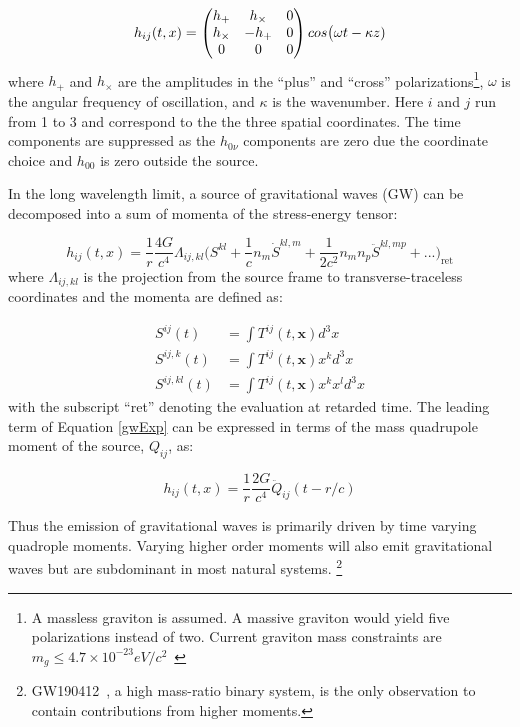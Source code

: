 \documentclass [12pt, proquest]{uwthesis}[2019]
\begin{document}
\begin{equation}
h_{ij}(t,x)=\begin{pmatrix} h_+ & h_\times & 0 \\ h_\times & -h_+ & 0 \\ 0 & 0 & 0\end{pmatrix} \\cos\big(\omega t - \kappa z)
\end{equation}
where $h_+$ and $h_\times$ are the amplitudes in the ``plus'' and ``cross'' polarizations\footnote{A massless graviton is assumed. A massive graviton would yield five polarizations instead of two. Current graviton mass constraints are $m_g\leq 4.7\times 10^{-23} eV/c^2$~\cite{graviton}}, $\omega$ is the angular frequency of oscillation, and $\kappa$ is the wavenumber. Here $i$ and $j$ run from 1 to 3 and correspond to the the three spatial coordinates. The time components are suppressed as the $h_{0\nu}$ components are zero due the coordinate choice and $h_{00}$ is zero outside the source. 

In the long wavelength limit, a source of gravitational waves (GW) can be decomposed into a sum of momenta of the stress-energy tensor:

\begin{equation}
h_{ij}(t,x)=\frac{1}{r}\frac{4 G}{c^4} \Lambda_{ij,kl} \bigg( S^{kl} +\frac{1}{c} n_m \dot{S}^{kl,m} +\frac{1}{2c^2} n_m n_p \ddot{S}^{kl,mp}+...\bigg)_\text{ret} \label{gwExp}
\end{equation}
where $\Lambda_{ij,kl}$ is the projection from the source frame to transverse-traceless coordinates and the momenta are defined as:

\begin{align}
S^{ij}(t)&=\int T^{ij}(t,\mathbf{x}) d^3x\\
S^{ij,k}(t)&=\int T^{ij}(t,\mathbf{x}) x^k d^3x\\
S^{ij,kl}(t)&=\int T^{ij}(t,\mathbf{x}) x^k x^l d^3x
\end{align}
with the subscript ``ret'' denoting the evaluation at retarded time. The leading term of Equation \ref{gwExp} can be expressed in terms of the mass quadrupole moment of the source, $Q_{ij}$, as:

\begin{equation}
h_{ij}(t,x)=\frac{1}{r}\frac{2 G}{c^4} \ddot{Q}_{ij}(t-r/c)
\end{equation}

Thus the emission of gravitational waves is primarily driven by time varying quadrople moments. Varying higher order moments will also emit gravitational waves but are subdominant in most natural systems. \footnote{GW190412~\cite{GW190412}, a high mass-ratio binary system, is the only observation to contain contributions from higher moments.}
\end{document}
